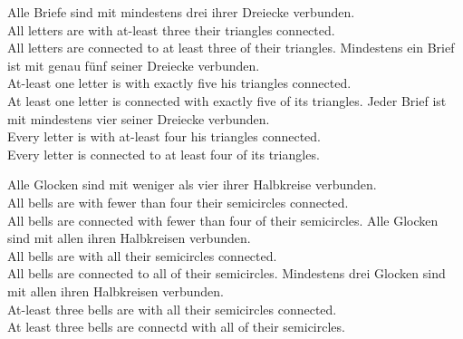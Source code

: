 \documentclass[fleqn,reqno,10pt]{article}
\begin{document}
\begin{exe}
  \ex \label{bsp:controls-as}
    \begin{xlist}
\ex \label{bsp:controls-as-1} \gll Alle Briefe sind mit mindestens drei ihrer Dreiecke verbunden.\\
  All letters are with at-least three their triangles connected.\\
  \trans All letters are connected to at least three of their triangles.
\ex \label{bsp:controls-as-2} \gll Mindestens ein Brief ist mit genau f\"unf seiner Dreiecke verbunden.\\
  At-least one letter is with exactly five his triangles connected.\\
  \trans At least one letter is connected with exactly five of its triangles.
\ex \label{bsp:controls-as-3} \gll Jeder Brief ist mit mindestens vier seiner Dreiecke verbunden.\\
  Every letter is with at-least four his triangles connected.\\
  \trans Every letter is connected to at least four of its triangles.
\end{xlist}
\end{exe}

\begin{exe}
\ex \label{bsp:controls-es}
  \begin{xlist}
\ex \label{bsp:controls-es-1} \gll Alle Glocken sind mit weniger als
  vier ihrer Halbkreise verbunden. \\ 
All bells are with fewer than four their semicircles connected.\\
\trans All bells are connected with fewer than four of their semicircles.  
\ex \label{bsp:controls-es-2} \gll Alle Glocken sind mit allen ihren Halbkreisen verbunden.\\
All bells are with all their semicircles connected.\\
\trans All bells are connected to all of their semicircles. 
\ex \label{bsp:controls-es-3} \gll Mindestens drei Glocken sind mit
  allen ihren Halbkreisen verbunden.\\ 
  At-least three bells are with all  their semicircles connected.\\
  \trans At least three bells are connectd with all of their semicircles.
\end{xlist}
\end{exe}
\end{document}
